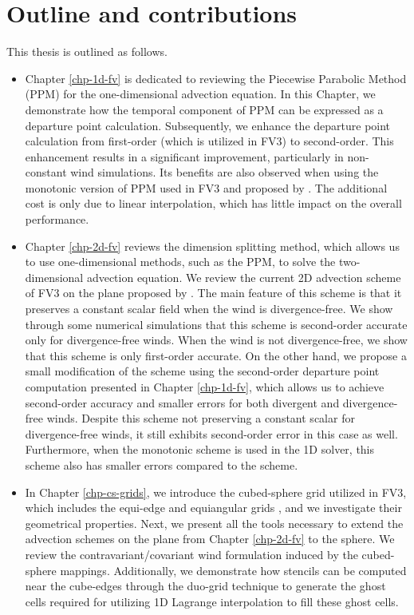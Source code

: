 \section{Outline and contributions}
This thesis is outlined as follows.
\begin{itemize}
\item Chapter \ref{chp-1d-fv} is dedicated to reviewing the Piecewise Parabolic Method (PPM) for the one-dimensional advection equation. 
In this Chapter, we demonstrate how the temporal component of PPM can be expressed as a departure point calculation. 
Subsequently, we enhance the departure point calculation from first-order (which is utilized in FV3) to second-order.
This enhancement results in a significant improvement, particularly in non-constant wind simulations.
Its benefits are also observed when using the monotonic version of PPM used in FV3 and proposed by \citet{lin:2004}.
The additional cost is only due to linear interpolation, which has little impact on the overall performance.

\item Chapter \ref{chp-2d-fv} reviews the dimension splitting method, which allows us to use one-dimensional methods, 
such as the PPM, to solve the two-dimensional advection equation. 
We review the current 2D advection scheme of FV3 on the plane proposed by \citet{putman:2007}.
The main feature of this scheme is that it preserves a constant scalar field when the wind is divergence-free.
We show through some numerical simulations that this scheme is second-order accurate only for divergence-free winds.
When the wind is not divergence-free, we show that this scheme is only first-order accurate.
On the other hand, we propose a small modification of the \citet{putman:2007} scheme 
using the second-order departure point computation presented in Chapter \ref{chp-1d-fv},
which allows us to achieve second-order accuracy and smaller errors for both divergent and divergence-free winds. 
Despite this scheme not preserving a constant scalar for divergence-free winds, it still exhibits second-order error in this case as well. 
Furthermore, when the monotonic scheme is used in the 1D solver, this scheme also has smaller errors compared to the \citet{putman:2007} scheme.

\item In Chapter \ref{chp-cs-grids}, we introduce the cubed-sphere grid utilized in FV3, 
which includes the equi-edge \citep{chen:2021} and equiangular grids \citep{ronchi:1996}, 
and we investigate their geometrical properties.
Next, we present all the tools necessary to extend the advection schemes on the plane from Chapter \ref{chp-2d-fv} to the sphere.
We review the contravariant/covariant wind formulation induced by the cubed-sphere mappings.
Additionally, we demonstrate how stencils can be computed near the cube-edges through the duo-grid 
technique to generate the ghost cells required for utilizing 1D Lagrange interpolation to fill these ghost cells.



\end{itemize}
